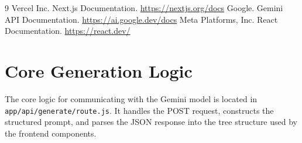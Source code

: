 \documentclass[12pt,a4paper]{report}
\begin{document}
\begin{thebibliography}{9}
Vercel Inc. Next.js Documentation. \url{https://nextjs.org/docs}
Google. Gemini API Documentation. \url{https://ai.google.dev/docs}
Meta Platforms, Inc. React Documentation. \url{https://react.dev/}
\end{thebibliography}

\appendix
\chapter{Core Generation Logic}
The core logic for communicating with the Gemini model is located in \texttt{app/api/generate/route.js}. It handles the POST request, constructs the structured prompt, and parses the JSON response into the tree structure used by the frontend components.
\end{document}
